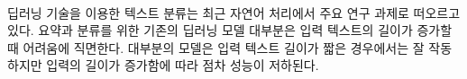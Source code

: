 
\makeabstractheaderkorean


~\label{sec:abstract_korean}

딥러닝 기술을 이용한 텍스트 분류는 최근 자연어 처리에서 주요 연구 과제로 떠오르고 있다. 요약과 분류를 위한 기존의 딥러닝 모델 대부분은 입력 텍스트의 길이가 증가할 때 어려움에 직면한다. 대부분의 모델은 입력 텍스트 길이가 짧은 경우에서는 잘 작동하지만 입력의 길이가 증가함에 따라 점차 성능이 저하된다.
